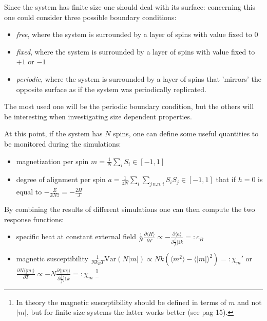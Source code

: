 \documentclass[a4paper, 11pt]{article}
\begin{document}
    Since the system has finite size one should deal with its surface: concerning this one could consider three possible boundary conditions:
    \begin{itemize}
      \item \emph{free}, where the system is surrounded by a layer of spins with value fixed to $0$
      \item \emph{fixed}, where the system is surrounded by a layer of spins with value fixed to $+1$ or $-1$
      \item \emph{periodic}, where the system is surrounded by a layer of spins that 'mirrors' the opposite surface as if the system was periodically replicated.
    \end{itemize}
    The most used one will be the periodic boundary condition, but the others will be interesting when investigating size dependent properties.

    At this point, if the system has $N$ spins, one can define some useful quantities to be monitored during the simulations:
    \begin{itemize}
      \item magnetization per spin $m = \frac{1}{N} \sum_i S_i \in [-1, 1]$
      \item degree of alignment per spin $a = \frac{1}{zN} \sum_i \sum_{j \, n.n. \, i} S_i S_j \in [-1, 1]$ that if $h = 0$ is equal to $-\frac{E}{kNz} = -\frac{2H}{J}$
    \end{itemize}

    By combining the results of different simulations one can then compute the two response functions:
    \begin{itemize}
      \item specific heat at constant external field $\frac{1}{N} \frac{\partial \langle H \rangle }{\partial T} \propto -\frac{\partial \langle a \rangle }{\partial \frac[f]{1}{k}} =: c_B$
      \item magnetic susceptibility $\frac{1}{Nk_BT} \text{Var}(N|m|) \propto Nk(\langle m^2 \rangle - \langle |m| \rangle^2 ) =: \chi_m'$ or $\frac{\partial N \langle |m| \rangle }{\partial T} \propto -N\frac{\partial \langle |m| \rangle }{\partial \frac[f]{1}{k}} =: \chi_m$ \footnote{In theory the magnetic susceptibility should be defined in terms of $m$ and not $|m|$, but for finite size systems the latter works better (see \cite{rif:eye-opener} pag 15).}
    \end{itemize}
\end{document}
